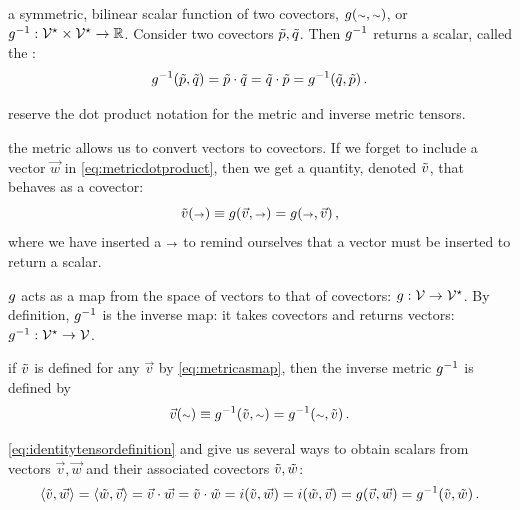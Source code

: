  a symmetric, bilinear scalar function of two covectors, $\metric\vat{\cslot,\cslot}$, or ${{g}^{-1}}:{\mathcal{V}^{\star}\times\mathcal{V}^{\star}}\to{\mathbb{R}}$. Consider two covectors $\tilde{p},\tilde{q}$. Then ${g}^{-1}$ returns a scalar, called the :
%
\begin{equation}\label{eq:inversemetricdotproduct}
  \invmet\vat{\cov p, \cov q} = \cov p\iprod\cov q
                              = \cov q\iprod\cov p 
                              = \invmet\vat{\cov q,\cov p}\,.
\end{equation}

 reserve the dot product notation for the metric and inverse metric tensors.

 the metric allows us to convert vectors to covectors. If we forget to include a vector $\vec w$ in \cref{eq:metricdotproduct}, then we get a quantity, denoted $\tilde{v}$, that behaves as a covector:
%
\begin{equation}\label{eq:metricasmap}
  \cov v\vat{\vslot} \defas \metric\vat{\vec v, \vslot}
                      = \metric\vat{\vslot, \vec v}\,,
\end{equation}
%
where we have inserted a ${\scriptstyle\rightarrow}$ to remind ourselves that a vector must be inserted to return a scalar.

 $g$ acts as a map from the space of vectors to that of covectors: ${g}:{\mathcal{V}}\to{\mathcal{V}^{\star}}$. By definition, ${g}^{-1}$ is the inverse map: it takes covectors and returns vectors: ${{g}^{-1}}:{\mathcal{V}^{\star}}\to{\mathcal{V}}$.

 if $\tilde{v}$ is defined for any $\vec v$ by \cref{eq:metricasmap}, then the inverse metric ${g}^{-1}$ is defined by
%
\begin{equation}\label{eq:inversemetricasmap}
  \vec v\vat{\cslot} \defas \invmet\vat{\cov v, \cslot}
                      = \invmet\vat{\cslot, \cov v}\,.
\end{equation}

 \cref{eq:identitytensordefinition} and  give us several ways to obtain scalars from vectors $\vec v,\vec w$ and their associated covectors $\tilde{v},\tilde{w}$:
%
\begin{equation}\label{eq:scalarsfromvecsandassociatedcovecs}
  \sprod{\cov v}{\vec w} = \sprod{\cov w}{\vec v}
                         = \vec v\iprod\vec w
                         = \cov v\iprod\cov w
                         = \idtens\vat{\cov v,\vec w}
                         = \idtens\vat{\cov w,\vec v}
                         = \metric\vat{\vec v,\vec w}
                         = \invmet\vat{\cov v,\cov w}\,.
\end{equation}

